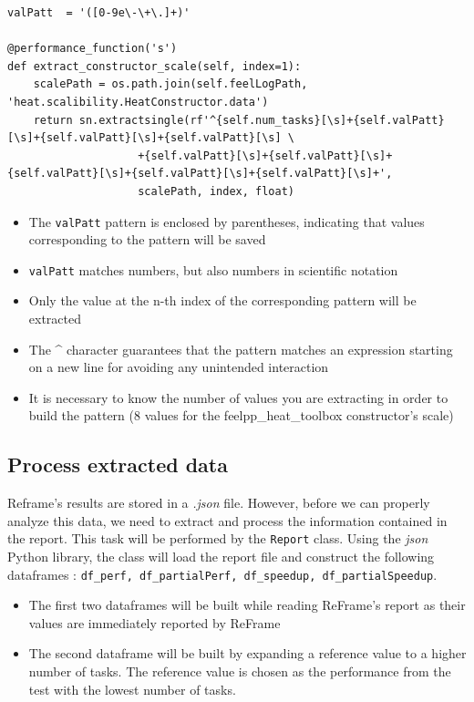 \documentclass[12pt]{article}
\begin{document}
\begin{scriptsize}
\begin{verbatim}
valPatt  = '([0-9e\-\+\.]+)'

@performance_function('s')
def extract_constructor_scale(self, index=1):
    scalePath = os.path.join(self.feelLogPath, 'heat.scalibility.HeatConstructor.data')
    return sn.extractsingle(rf'^{self.num_tasks}[\s]+{self.valPatt}[\s]+{self.valPatt}[\s]+{self.valPatt}[\s] \
                    +{self.valPatt}[\s]+{self.valPatt}[\s]+{self.valPatt}[\s]+{self.valPatt}[\s]+{self.valPatt}[\s]+',
                    scalePath, index, float)
\end{verbatim}
\end{scriptsize}

\begin{itemize}
    \item The \small{\texttt{valPatt}} pattern is enclosed by parentheses, indicating that values corresponding to the pattern will be saved
    \item \small{\texttt{valPatt}} matches numbers, but also numbers in scientific notation
    \item Only the value at the n-th index of the corresponding pattern will be extracted
    \item The \^{} character guarantees that the pattern matches an expression starting on a new line for avoiding any unintended interaction
    \item It is necessary to know the number of values you are extracting in order to build the pattern (8 values for the feelpp\_heat\_toolbox constructor's scale)
\end{itemize}


\subsection{Process extracted data}
Reframe's results are stored in a \textit{.json} file. However, before we can properly analyze this data, we need to extract and process the information contained in the report.
This task will be performed by the \small{\texttt{Report}} class. Using the \textit{json} Python library, the class will load the report file and construct the following dataframes :
\texttt{df\_perf, df\_partialPerf, df\_speedup, df\_partialSpeedup}.

\begin{itemize}
    \item The first two dataframes will be built while reading ReFrame's report as their values are immediately reported by ReFrame
    \item The second dataframe will be built by expanding a reference value to a higher number of tasks.
    The reference value is chosen as the performance from the test with the lowest number of tasks.
\end{itemize}
\end{document}
